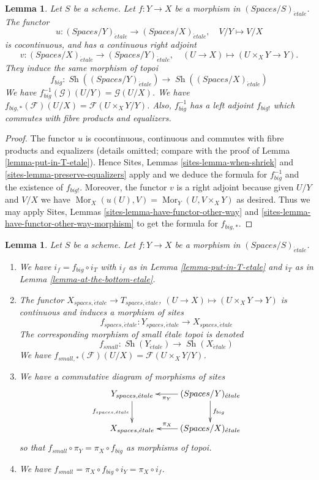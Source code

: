 \documentclass{stacks-project}
\theoremstyle{plain}
\newtheorem{lemma}[subsection]{Lemma}
\theoremstyle{definition}
\theoremstyle{remark}
\numberwithin{equation}{subsection}
\def\Mor{\mathop{\mathrm{Mor}}\nolimits}
\def\Sh{\mathop{\mathit{Sh}}\nolimits}
\def\etale{{\acute{e}tale}}
\begin{document}
\begin{lemma}
\label{lemma-morphism-big-etale}
Let $S$ be a scheme. Let $f : Y \to X$ be a morphism in
$(\textit{Spaces}/S)_\etale$. The functor
$$
u :
(\textit{Spaces}/Y)_\etale
\longrightarrow
(\textit{Spaces}/X)_\etale,
\quad
V/Y \longmapsto V/X
$$
is cocontinuous, and has a continuous right adjoint
$$
v :
(\textit{Spaces}/X)_\etale
\longrightarrow
(\textit{Spaces}/Y)_\etale,
\quad
(U \to X) \longmapsto (U \times_X Y \to Y).
$$
They induce the same morphism of topoi
$$
f_{big} :
\Sh((\textit{Spaces}/Y)_\etale)
\longrightarrow
\Sh((\textit{Spaces}/X)_\etale)
$$
We have $f_{big}^{-1}(\mathcal{G})(U/Y) = \mathcal{G}(U/X)$.
We have $f_{big, *}(\mathcal{F})(U/X) = \mathcal{F}(U \times_X Y/Y)$.
Also, $f_{big}^{-1}$ has a left adjoint $f_{big!}$ which commutes with
fibre products and equalizers.
\end{lemma}

\begin{proof}
The functor $u$ is cocontinuous, continuous and commutes with fibre products
and equalizers (details omitted; compare with the proof of
Lemma \ref{lemma-put-in-T-etale}).
Hence
Sites, Lemmas \ref{sites-lemma-when-shriek} and
\ref{sites-lemma-preserve-equalizers}
apply and we deduce the formula
for $f_{big}^{-1}$ and the existence of $f_{big!}$. Moreover,
the functor $v$ is a right adjoint because given $U/Y$ and $V/X$
we have $\Mor_X(u(U), V) = \Mor_Y(U, V \times_X Y)$
as desired. Thus we may apply
Sites, Lemmas \ref{sites-lemma-have-functor-other-way} and
\ref{sites-lemma-have-functor-other-way-morphism} to get the
formula for $f_{big, *}$.
\end{proof}

\begin{lemma}
\label{lemma-morphism-big-small-etale}
Let $S$ be a scheme. Let $f : Y \to X$ be a morphism in
$(\textit{Spaces}/S)_\etale$.
\begin{enumerate}
\item We have $i_f = f_{big} \circ i_T$ with $i_f$ as in
Lemma \ref{lemma-put-in-T-etale} and $i_T$ as in
Lemma \ref{lemma-at-the-bottom-etale}.
\item The functor $X_{spaces, \etale} \to T_{spaces, \etale}$,
$(U \to X) \mapsto (U \times_X Y \to Y)$ is continuous and induces
a morphism of sites
$$
f_{spaces, \etale} : Y_{spaces, \etale} \longrightarrow X_{spaces, \etale}
$$
The corresponding morphism of small \'etale topoi is denoted
$$
f_{small} : \Sh(Y_\etale) \to \Sh(X_\etale)
$$
We have $f_{small, *}(\mathcal{F})(U/X) = \mathcal{F}(U \times_X Y/Y)$.
\item We have a commutative diagram of morphisms of sites
$$
\xymatrix{
Y_{spaces, \etale} \ar[d]_{f_{spaces, \etale}} &
(\textit{Spaces}/Y)_\etale \ar[d]^{f_{big}} \ar[l]^-{\pi_Y}\\
X_{spaces, \etale} &
(\textit{Spaces}/X)_\etale \ar[l]_-{\pi_X}
}
$$
so that $f_{small} \circ \pi_Y = \pi_X \circ f_{big}$ as morphisms of topoi.
\item We have $f_{small} = \pi_X \circ f_{big} \circ i_Y = \pi_X \circ i_f$.
\end{enumerate}
\end{lemma}
\end{document}
